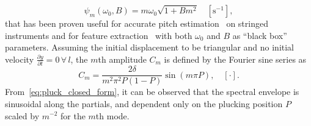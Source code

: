 \begin{equation}\label{eq:pianoModel}
  \psi_m(\omega_0,B) = m \omega_0 \sqrt{1+B m^2} \quad [\text{s}^{-1}], 
\end{equation}
that has been proven useful for accurate pitch estimation~\cite{galembo1994measuring, nillson:multipitch_inharmonic_signals} on stringed instruments and for feature extraction~\cite{michelson2018_aes,abesser2012feature,barbancho:inharmonicity_tablature} with both $\omega_0$ and $B$ as ``black box'' parameters.
Assuming the initial displacement to be triangular and no initial velocity $\frac{\partial y}{\partial t} = 0 \, \forall\, l$, the $m$th amplitude $C_m$ is defined by the Fourier sine series as~\cite{donkin:acoustics,fletcher:principles_of_vibration_and_sound}
\begin{equation}\label{eq:pluck_closed_form}
    C_m = \frac{2\delta}{m^2\pi^2P(1-P)}\sin(m\pi P), \quad [\cdot].
\end{equation}
From~\eqref{eq:pluck_closed_form}, it can be observed that the spectral envelope is sinusoidal along the partials, and dependent only on the plucking position $P$ scaled by $m^{-2}$ for the $m$th mode.

